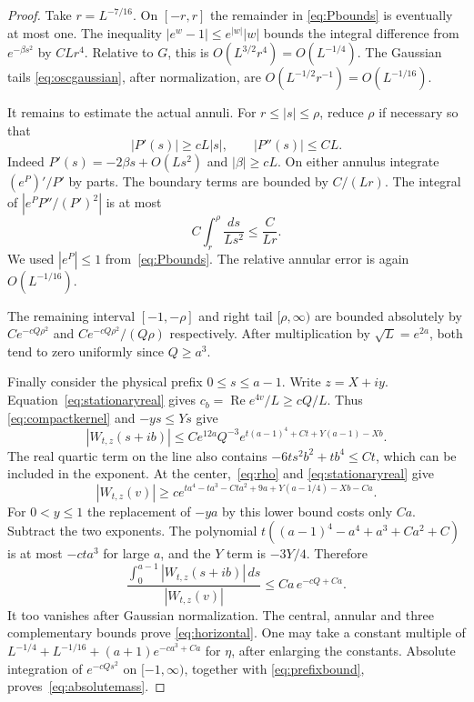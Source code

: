 \documentclass[11pt]{article}
\theoremstyle{remark}\newtheorem{remark}[theorem]{Remark}
\DeclareMathOperator{\Rea}{Re}\DeclareMathOperator{\Ima}{Im}
\begin{document}
\begin{proof}
Take $r=L^{-7/16}$. On $[-r,r]$ the remainder in
\eqref{eq:Pbounds} is eventually at most one. The inequality
$|e^w-1|\leq e^{|w|}|w|$ bounds the integral difference
from $e^{-\beta s^2}$ by $CLr^4$. Relative to $G$, this is
$O(L^{3/2}r^4)=O(L^{-1/4})$. The Gaussian tails
\eqref{eq:oscgaussian}, after normalization, are
$O(L^{-1/2}r^{-1})=O(L^{-1/16})$.

It remains to estimate the actual annuli. For
$r\leq|s|\leq\rho$, reduce $\rho$ if necessary so that
\[
 |P'(s)|\geq cL|s|,\qquad |P''(s)|\leq CL.
\]
Indeed $P'(s)=-2\beta s+O(Ls^2)$ and
$|\beta|\geq cL$. On either annulus integrate
$(e^P)'/P'$ by parts. The boundary terms are bounded by
$C/(Lr)$. The integral of $|e^P P''/(P')^2|$ is at most
\[
 C\int_r^\rho\frac{ds}{Ls^2}\leq\frac{C}{Lr}.
\]
We used $|e^P|\leq1$ from~\eqref{eq:Pbounds}.
The relative annular error is again $O(L^{-1/16})$.

The remaining interval $[-1,-\rho]$ and right tail
$[\rho,\infty)$ are bounded absolutely by
$Ce^{-cQ\rho^2}$ and $Ce^{-cQ\rho^2}/(Q\rho)$ respectively.
After multiplication by $\sqrt L=e^{2a}$, both tend to zero
uniformly since $Q\geq a^3$.

Finally consider the physical prefix $0\leq s\leq a-1$.
Write $z=X+iy$. Equation~\eqref{eq:stationaryreal} gives
$c_b=\Rea e^{4v}/L\geq cQ/L$. Thus
\eqref{eq:compactkernel} and $-y s\leq Ys$ give
\[
 |W_{t,z}(s+ib)|
 \leq C e^{12a}Q^{-3}
          e^{t(a-1)^4+Ct+Y(a-1)-Xb}.
\]
The real quartic term on the line also contains
$-6ts^2b^2+tb^4\leq Ct$, which can be included in the exponent.
At the center,~\eqref{eq:rho} and
\eqref{eq:stationaryreal} give
\[
 |W_{t,z}(v)|\geq c
 e^{ta^4-ta^3-Cta^2+9a+Y(a-1/4)-Xb-Ca}.
\]
For $0<y\leq1$ the replacement of $-ya$ by this lower bound
costs only $Ca$. Subtract the two exponents. The polynomial
$t((a-1)^4-a^4+a^3+Ca^2+C)$ is at most $-ct a^3$
for large $a$, and the $Y$ term is $-3Y/4$. Therefore
\begin{equation}\label{eq:prefixbound}
 \frac{\int_0^{a-1}|W_{t,z}(s+ib)|\,ds}{|W_{t,z}(v)|}
                       \leq Ca\,e^{-cQ+Ca}.
\end{equation}
It too vanishes after Gaussian normalization.
The central, annular and three complementary bounds prove
\eqref{eq:horizontal}. One may take a constant multiple of
$L^{-1/4}+L^{-1/16}+(a+1)e^{-ca^3+Ca}$ for $\eta$,
after enlarging the constants. Absolute integration of
$e^{-cQs^2}$ on $[-1,\infty)$, together with
\eqref{eq:prefixbound}, proves~\eqref{eq:absolutemass}.
\end{proof}
\end{document}
